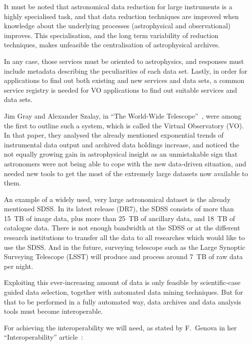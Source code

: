	 It must be noted that astronomical data reduction for large
	instruments is a highly specialised task, and that data
	reduction techniques are improved when knowledge about the
	underlying processes (astrophysical and observational)
	improves. This specialisation, and the long term variability of
	reduction techniques, makes unfeasible the centralisation of
	astrophysical archives.
	
	 In any case, those services must be oriented to astrophysics,
	and responses must include metadata describing the
	peculiarities of each data set.  Lastly, in order for applications to
	find out both existing and new services and data sets, a common
	service registry is needed for VO applications to find out
	suitable services and data sets.
	
	 Jim Gray and Alexander Szalay, in ``The World-Wide
	Telescope''~\cite{2001Sci...293.2037S}, were among the first to
	outline such a system, which is called the Virtual Observatory
	(VO). In that paper, they analysed the already mentioned
	exponential trends of instrumental data output and archived
	data holdings increase, and noticed the not equally growing
	gain in astrophysical insight as an unmistakable sign that
	astronomers were not being able to cope with the new
	data-driven situation, and needed new tools to get the most of
	the extremely large datasets now available to them.
	
	 An example of a widely used, very large astronomical dataset
	is the already mentioned SDSS. In its latest release (DR7), the
	SDSS consists of more than 15~TB of image data, plus more than
	25~TB of ancillary data, and 18~TB of catalogue data. There is
	not enough bandwidth at the SDSS or at the different research
	institutions to transfer all the data to all researches which
	would like to use the SDSS. And in the future, surveying
	telescope such as the Large Synoptic Surveying Telescope (LSST)
	will produce and process around 7~TB of raw data per night.
	
	 Exploiting this ever-increasing amount of data is only
	feasible by scientific-case guided data selection, together
	with automated data mining techniques. But for that to be
	performed in a fully automated way, data archives and data
	analysis tools must become interoperable.


	For achieving the interoperability we will need, as stated by
	F.~Genova in her ``Interoperability''
	article~\cite{2002ASPC..281...41G}:
	
